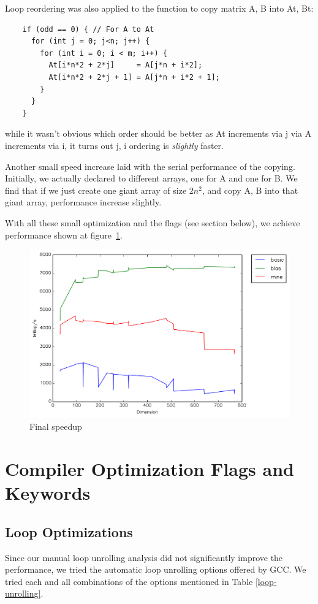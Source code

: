 \documentclass{article}
\begin{document}
    Loop reordering was also applied to the function to copy matrix A, B into At, Bt:
    \begin{lstlisting}
    if (odd == 0) { // For A to At
      for (int j = 0; j<n; j++) {
        for (int i = 0; i < m; i++) {
          At[i*n*2 + 2*j]     = A[j*n + i*2];
          At[i*n*2 + 2*j + 1] = A[j*n + i*2 + 1];
        }
      }
    }
    \end{lstlisting}

    while it wasn't obvious which order should be better as At increments via j via A increments via i, it turns out j, i ordering is \emph{slightly} faster.

    Another small speed increase laid with the serial performance of the copying. Initially, we actually declared to different arrays, one for A and one for B.
    We find that if we just create one giant array of size $2n^2$, and copy A, B into that giant array, performance increase slightly.

    With all these small optimization and the flags (see section below), we achieve performance shown at figure~\ref{fig:final}.

    \begin{figure}[h]
      \centering
      \includegraphics[width=.7\textwidth]{final.pdf}
      \caption{Final speedup}
      \label{fig:final}
    \end{figure}

\section{Compiler Optimization Flags and Keywords}

\subsection{Loop Optimizations}

Since our manual loop unrolling analysis did not significantly improve the performance, we tried the automatic loop unrolling options offered by GCC. We tried each and all combinations of the options mentioned in Table \ref{loop-unrolling}. 
\end{document}

